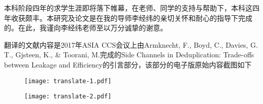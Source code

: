 \documentclass[bachelor]{thesis-uestc}
\begin{document}
\thesistableofcontents

\thesischapterexordium













\thesisacknowledgement

本科阶段四年的求学生涯即将落下帷幕，在老师、同学的支持与帮助下，本科这四年收获颇丰。本研究及论文是在我的导师李经纬的亲切关怀和耐心的指导下完成的。在此，我谨向李经纬老师至以万分诚挚的谢意。

\nocite{*}



\thesisappendix



\thesistranslationoriginal

翻译的文献内容是2017年ASIA CCS会议上由Armknecht, F., Boyd, C., Davies, G. T., Gjsteen, K., \& Toorani, M.完成的Side Channels in Deduplication: Trade-offs between Leakage and Efficiency的引言部分，该部分的电子版原始内容截图如下

\begin{figure}[!htb]
    \small
    \centering
    \texttt{[image: translate-1.pdf]} 
    \label{fig:}
\end{figure}
\begin{figure}[!htb]
    \small
    \centering
    \texttt{[image: translate-2.pdf]} 
    \label{fig:}
\end{figure}
%
%
\thesistranslationchinese
%

\end{document}
